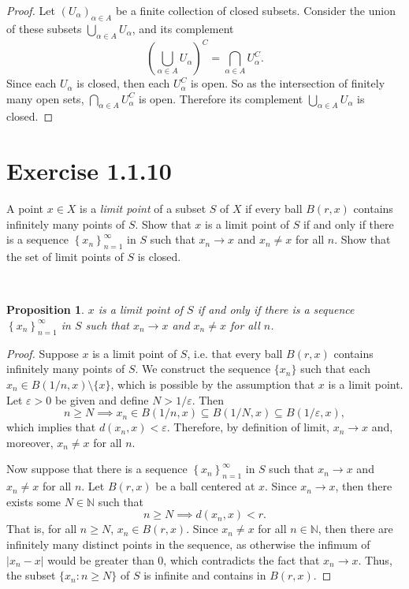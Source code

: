 \documentclass[12pt]{article}
\newcommand{\N}{\mathbb{N}}
\newcommand{\eps}{\varepsilon}
\newenvironment{problem}
    {\begin{lrbox}{\mybox}\begin{minipage}{\textwidth-10pt}}
    {\end{minipage}\end{lrbox}\framebox[6.5in]{\usebox{\mybox}}\\}
\newtheorem{proposition}{Proposition}
\newcommand{\seq}[1]{\left\{#1\right\}_{n=1}^\infty}
\begin{document}
\begin{proof}
    Let $(U_\alpha)_{\alpha\in A}$ be a finite collection of closed subsets. Consider the union of these subsets $\bigcup_{\alpha\in A}U_\alpha$, and its complement
    \[\left(\bigcup_{\alpha\in A}U_\alpha\right)^C = \bigcap_{\alpha\in A}U_\alpha^C.\]
    Since each $U_\alpha$ is closed, then each $U_\alpha^C$ is open. So as the intersection of finitely many open sets, $\bigcap_{\alpha\in A}U_\alpha^C$ is open. Therefore its complement $\bigcup_{\alpha\in A}U_\alpha$ is closed. 
    
\end{proof}

\section*{Exercise 1.1.10}
\begin{problem}
    A point $x\in X$ is a \textit{limit point} of a subset $S$ of $X$ if every ball $B(r,x)$ contains infinitely many points of $S$. Show that $x$ is a limit point of $S$ if and only if there is a sequence $\seq{x_n}$ in $S$ such that $x_n\to x$ and $x_n\ne x$ for all $n$. Show that the set of limit points of $S$ is closed.
\end{problem}

\begin{proposition}
    $x$ is a limit point of $S$ if and only if there is a sequence $\seq{x_n}$ in $S$ such that $x_n\to x$ and $x_n\ne x$ for all $n$.
\end{proposition}

\begin{proof}
    Suppose $x$ is a limit point of $S$, i.e. that every ball $B(r,x)$ contains infinitely many points of $S$. We construct the sequence $\{x_n\}$ such that each $x_n\in B(1/n, x)\setminus\{x\}$, which is possible by the assumption that $x$ is a limit point. Let $\eps>0$ be given and define $N>1/\eps$. Then
    \[n\geq N \implies x_n\in B(1/n,x)\subseteq B(1/N,x) \subseteq B(1/\eps, x),\]
    which implies that $d(x_n,x)<\eps$. Therefore, by definition of limit, $x_n\to x$ and, moreover, $x_n\ne x$ for all $n$.
    
    Now suppose that there is a sequence $\seq{x_n}$ in $S$ such that $x_n\to x$ and $x_n\ne x$ for all $n$. Let $B(r,x)$ be a ball centered at $x$. Since $x_n\to x$, then there exists some $N\in\N$ such that
    \[n\geq N \implies d(x_n, x) < r.\]
    That is, for all $n\geq N$, $x_n\in B(r,x)$. Since $x_n\ne x$ for all $n\in\N$, then there are infinitely many distinct points in the sequence, as otherwise the infimum of $|x_n-x|$ would be greater than $0$, which contradicts the fact that $x_n\to x$. Thus, the subset $\{x_n : n\geq N\}$ of $S$ is infinite and contains in $B(r,x)$.
    
\end{proof}
\end{document}
